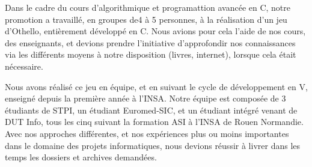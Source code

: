 Dans le cadre du cours d'algorithmique et programattion avancée en C, notre promotion a travaillé, en groupes de4 à 5 personnes, à la réalisation d'un jeu d'Othello, entièrement développé en C. Nous avions pour cela l'aide de nos cours, des enseignants, et devions prendre l'initiative d'approfondir nos connaissances via les différents moyens à notre disposition (livres, internet), lorsque cela était nécessaire.

Nous avons réalisé ce jeu en équipe, et en suivant le cycle de développement en V, enseigné depuis la première année à l'INSA. Notre équipe est composée de 3 étudiants de STPI, un étudiant Euromed-SIC, et un étudiant intégré venant de DUT Info, tous les cinq suivant la formation ASI à l'INSA de Rouen Normandie. Avec nos approches différentes, et nos expériences plus ou moins importantes dans le domaine des projets informatiques, nous devions réussir à livrer dans les temps les dossiers et archives demandées.